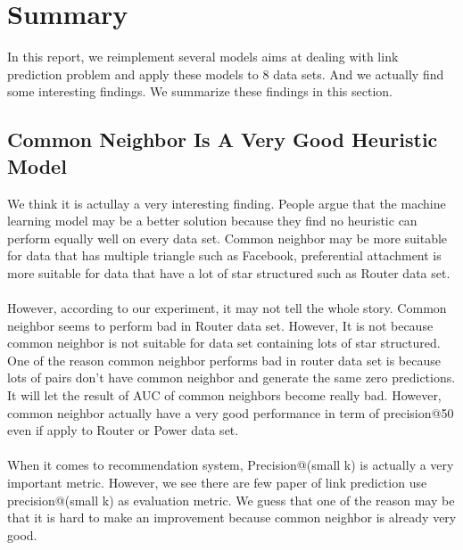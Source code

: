 \documentclass[12pt]{article}
\begin{document}
\section{Summary}
In this report, we reimplement several models aims at dealing with link prediction problem and apply these models to 8 data sets. And we actually find some interesting findings. We summarize these findings in this section.

\subsection{Common Neighbor Is A Very Good Heuristic Model}
We think it is actullay a very interesting finding. People argue that the machine learning model may be a better solution because they find no heuristic can perform equally well on every data set. Common neighbor may be more suitable for data that has multiple triangle such as Facebook, preferential attachment is more suitable for data that have a lot of star structured such as Router data set. 
\\ \\
However, according to our experiment, it may not tell the whole story. Common neighbor seems to perform bad in Router data set. However, It is not because common neighbor is not suitable for data set containing lots of star structured. One of the reason common neighbor performs bad in router data set is because lots of pairs don't have common neighbor and generate the same zero predictions. It will let the result of AUC of common neighbors become really bad. However, common neighbor actually have a very good performance in term of precision@50 even if apply to Router or Power data set.
\\ \\
When it comes to recommendation system, Precision@(small k) is actually a very important metric. However, we see there are few paper of link prediction use precision@(small k) as evaluation metric. We guess that one of the reason may be that it is hard to make an improvement because common neighbor is already very good. 
\end{document}
